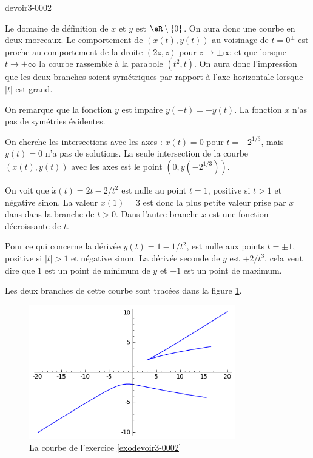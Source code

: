 \begin{corrige}{devoir3-0002}

  Le domaine de définition de $x$ et $y$ est $\eR\setminus\{0\}$. On aura donc une courbe en deux morceaux. Le comportement de $(x(t), y(t))$ au voisinage de $t=0^{\pm}$ est proche au comportement de la droite $(2z, z)$ pour $z\to \pm\infty$ et que lorsque $t\to \pm\infty$ la courbe rassemble à la parabole $(t^2, t)$. On aura donc l'impression que les deux branches soient symétriques par rapport à l'axe horizontale lorsque $|t|$ est grand. 

On remarque que la fonction $y$ est impaire $y(-t)= - y(t)$. La fonction $x$ n'as pas de symétries évidentes. 

On cherche les intersections avec les axes : $x(t)=0$ pour $t= -2^{1/3}$, mais $y(t)=0$ n'a pas de solutions. La seule intersection de la courbe $(x(t),y(t))$ avec les axes est le point  $(0, y(-2^{1/3}))$.   

On voit que $\dot x (t)= 2t -2/t^2$ est nulle au point $t=1$, positive si $t>1$ et négative sinon. La valeur $x(1)=3$ est donc la plus petite valeur prise par $x$ dans dans la branche de $t>0$. Dans l'autre branche $x$ est une fonction décroissante de $t$.   

Pour ce qui concerne la dérivée $\dot y (t) = 1-1/t^2$, est nulle aux points $t=\pm 1$, positive si $|t|>1$ et négative sinon. La dérivée seconde de $y$ est $+2/t^3$, cela veut dire que $1$ est un point de minimum de $y$ et $-1$ est un point de maximum. 

Les deux branches de cette courbe sont tracées dans la figure \ref{figdevoir3exo2}.

\begin{figure}
  \begin{center}
    \includegraphics[width=9cm]{figdevoir3exo2.png}

  \caption{La courbe de l'exercice \ref{exodevoir3-0002}}\label{figdevoir3exo2}
  \end{center}
 \end{figure}
\end{corrige}
